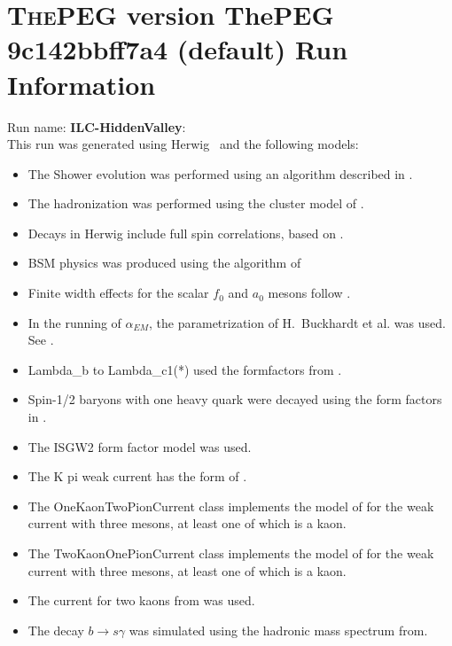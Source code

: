 \documentclass{article}
\begin{document}
\appendix
\section[xxx]{\textsc{ThePEG} version ThePEG 9c142bbff7a4 (default) \cite{ThePEG} Run Information}
Run name: \textbf{ILC-HiddenValley}:\\
This run was generated using Herwig~\cite{Bahr:2008pv} and the following models:
\begin{itemize}
\item The Shower evolution was performed using an algorithm described in \cite{Bahr:2008pv,Marchesini:1983bm,Marchesini:1987cf,Gieseke:2003rz,Masouminia:2021kne}.
\item The hadronization was performed using the cluster model of \cite{Webber:1983if}.
\item Decays in Herwig include full spin correlations, based on \cite{Richardson:2001df}.
\item BSM physics was produced using the algorithm of \cite{Gigg:2007cr,Gigg:2008yc}
\item Finite width effects for the scalar $f_0$ and $a_0$ mesons follow \cite{Flatte:1976xu}.
\item In the running of $\alpha_{EM}$, the parametrization of H.~Buckhardt et al. was used. See \cite{KLEISSCERN9808v3pp129}.
\item Lambda_b to Lambda_c1(*) used the formfactors from \cite{Huang:2000xw}.
\item Spin-1/2 baryons with one heavy quark were decayed using the form factors in \cite{Singleton:1990ye}.
\item The ISGW2 form factor model \cite{Scora:1995ty} was used.
\item The K pi weak current has the form of \cite{Finkemeier:1996dh}.
\item The OneKaonTwoPionCurrent class implements the model of \cite{Finkemeier:1995sr} for the weak current with three mesons, at least one of which is a kaon.
\item The TwoKaonOnePionCurrent class implements the model of \cite{Finkemeier:1995sr} for the weak current with three mesons, at least one of which is a kaon.
\item The current for two kaons from \cite{Czyz:2010hj} was used.
\item The decay $b\to s\gamma$ was simulated using the hadronic mass spectrum from\cite{Kagan:1998ym}.


\end{itemize}
\end{document}
